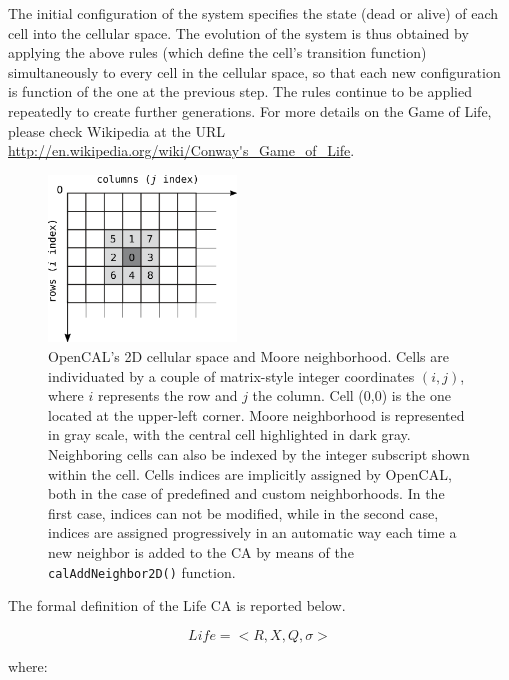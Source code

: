 The initial configuration of the system specifies the state (dead or
alive) of each cell into the cellular space. The evolution of the
system is thus obtained by applying the above rules (which define the
cell's transition function) simultaneously to every cell in the
cellular space, so that each new configuration is function of the one
at the previous step. The rules continue to be applied repeatedly to
create further generations. For more details on the Game of Life,
please check Wikipedia at the URL
\url{http://en.wikipedia.org/wiki/Conway's_Game_of_Life}.

\begin{figure}
  \begin{center}
    \includegraphics[width=5cm]{./images/OpenCAL/LifeNeighborhood.png}
    \caption{OpenCAL's 2D cellular space and Moore neighborhood. Cells
      are individuated by a couple of matrix-style integer coordinates
      $(i, j)$, where $i$ represents the row and $j$ the column. Cell
      (0,0) is the one located at the upper-left corner. Moore
      neighborhood is represented in gray scale, with the central cell
      highlighted in dark gray. Neighboring cells can also be indexed by
      the integer subscript shown within the cell. Cells indices are
      implicitly assigned by OpenCAL, both in the case of predefined
      and custom neighborhoods. In the first case, indices can not be
      modified, while in the second case, indices are assigned
      progressively in an automatic way each time a new neighbor is added
      to the CA by means of the \texttt{calAddNeighbor2D()} function.}
    \label{fig:LifeNeighborhood}
  \end{center}
\end{figure}

The formal definition of the Life CA is reported below.

$$Life = < R, X, Q, \sigma >$$

where:

